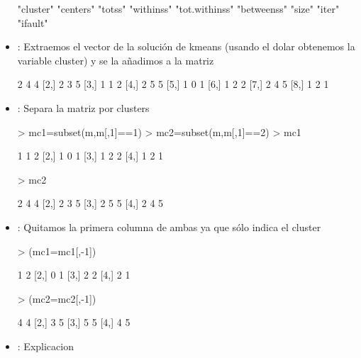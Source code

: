 \documentclass[a4paper, 12pt]{article}
\begin{document}
\begin{itemize}
\begin{Schunk}
\begin{Soutput}
[1] "cluster"      "centers"      "totss"        "withinss"     "tot.withinss" "betweenss"    "size"         "iter"         "ifault"      
\end{Soutput}
\end{Schunk}
		\item \texttt{}: 
		Extraemos el vector de la solución de kmeans  (usando el dolar obtenemos la variable cluster) y se la añadimos a la matriz
\begin{Schunk}
\begin{Soutput}
     [,1] [,2] [,3]
[1,]    2    4    4
[2,]    2    3    5
[3,]    1    1    2
[4,]    2    5    5
[5,]    1    0    1
[6,]    1    2    2
[7,]    2    4    5
[8,]    1    2    1
\end{Soutput}
\end{Schunk}
		\item \texttt{}: 
		Separa la matriz por clusters
\begin{Schunk}
\begin{Sinput}
> mc1=subset(m,m[,1]==1)
> mc2=subset(m,m[,1]==2)
> mc1
\end{Sinput}
\begin{Soutput}
     [,1] [,2] [,3]
[1,]    1    1    2
[2,]    1    0    1
[3,]    1    2    2
[4,]    1    2    1
\end{Soutput}
\begin{Sinput}
> mc2
\end{Sinput}
\begin{Soutput}
     [,1] [,2] [,3]
[1,]    2    4    4
[2,]    2    3    5
[3,]    2    5    5
[4,]    2    4    5
\end{Soutput}
\end{Schunk}
		\item \texttt{}: 
		Quitamos la primera columna de ambas ya que sólo indica el cluster
\begin{Schunk}
\begin{Sinput}
> (mc1=mc1[,-1])
\end{Sinput}
\begin{Soutput}
     [,1] [,2]
[1,]    1    2
[2,]    0    1
[3,]    2    2
[4,]    2    1
\end{Soutput}
\begin{Sinput}
> (mc2=mc2[,-1])
\end{Sinput}
\begin{Soutput}
     [,1] [,2]
[1,]    4    4
[2,]    3    5
[3,]    5    5
[4,]    4    5
\end{Soutput}
\end{Schunk}
		\item \texttt{}: 
		Explicacion

	\end{itemize}
	
\end{document}

